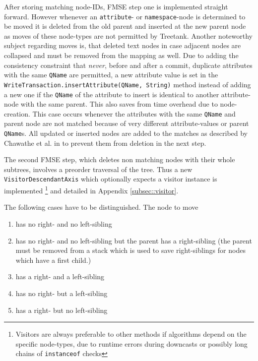After storing matching node-IDs, FMSE step one is implemented straight forward. However whenever an \texttt{attribute}- or \texttt{namespace}-node is determined to be moved it is deleted from the old parent and inserted at the new parent node as moves of these node-types are not permitted by Treetank. Another noteworthy subject regarding moves is, that deleted text nodes in case adjacent nodes are collapsed and must be removed from the mapping as well. Due to adding the consistency constraint that \emph{never}, before and after a commit, duplicate attributes with the same \texttt{QName} are permitted, a new attribute value is set in the \texttt{WriteTransaction.insertAttribute(QName, String)} method instead of adding a new one if the \texttt{QName} of the attribute to insert is identical to another attribute-node with the same parent. This also saves from time overhead due to node-creation. This case occurs whenever the attributes with the same \texttt{QName} and parent node are not matched because of very different attribute-values or parent \texttt{QName}s. All updated or inserted nodes are added to the matches as described by Chawathe et al. in \cite{chawathe1996change} to prevent them from deletion in the next step.

The second FMSE step, which deletes non matching nodes with their whole subtrees, involves a preorder traversal of the tree. Thus a new \\\texttt{VisitorDescendantAxis} which optionally expects a visitor instance is implemented \footnote{Visitors are always preferable to other methods if algorithms depend on the specific node-types, due to runtime errors during downcasts or possibly long chains of \texttt{instanceof} checks} and detailed in Appendix \ref{subsec::visitor}. 

The following cases have to be distinguished. The node to move

\begin{enumerate}
\item has no right- and no left-sibling
\item has no right- and no left-sibling but the parent has a right-sibling (the parent must be removed from a stack which is used to save right-siblings for nodes which have a first child.)
\item has a right- and a left-sibling
\item has no right- but a left-sibling
\item has a right- but no left-sibling
\end{enumerate}

